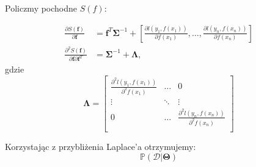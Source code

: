 \documentclass[12pt,a4paper]{article}
\begin{document}
Policzmy pochodne $S(f)$:

\begin{align*}
\frac{\partial S(\mathbf{f})}{\partial \mathbf{f}} &=
\mathbf{f}^T\mathbf{\Sigma}^{-1} + \left[ \frac{\partial\textit{l}(y_1, f(x_1))}{\partial f(x_1)}, \ldots, \frac{\partial\textit{l}(y_n, f(x_n))}{\partial f(x_n)} \right] \\
\frac{\partial^2 S(\mathbf{f})}{\partial \mathbf{f}\partial \mathbf{f}^T} &= 
\mathbf{\Sigma}^{-1}+\mathbf{\Lambda},
\end{align*}
gdzie 
$$
\mathbf{\Lambda} = 
	\left[
        \begin{array}{ccc}
         \frac{\partial^2\textit{l}(y_1, f(x_1))}{\partial^2 f(x_1)} & \ldots & 0\\
         \vdots & \ddots & \vdots \\
         0 & \ldots & \frac{\partial^2\textit{l}(y_n, f(x_n))}{\partial^2 f(x_n)} \\
        \end{array}
    \right] 
$$

Korzystając z przybliżenia Laplace'a otrzymujemy:
$$
\mathbb{P}(\mathcal{D}|\mathbf{\Theta})
$$
\end{document}
